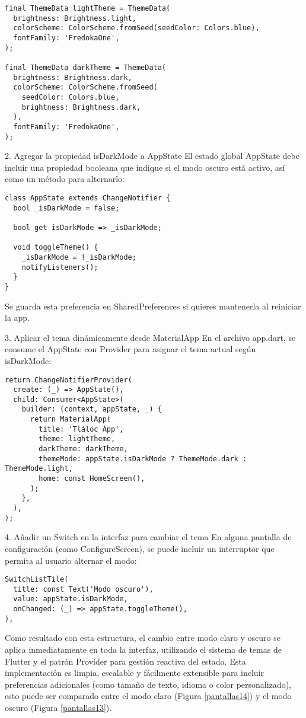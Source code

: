 \begin{verbatim}
final ThemeData lightTheme = ThemeData(
  brightness: Brightness.light,
  colorScheme: ColorScheme.fromSeed(seedColor: Colors.blue),
  fontFamily: 'FredokaOne',
);

final ThemeData darkTheme = ThemeData(
  brightness: Brightness.dark,
  colorScheme: ColorScheme.fromSeed(
    seedColor: Colors.blue,
    brightness: Brightness.dark,
  ),
  fontFamily: 'FredokaOne',
);
\end{verbatim}
2. Agregar la propiedad isDarkMode a AppState
El estado global AppState debe incluir una propiedad booleana que indique si el modo oscuro está activo, así como un método para alternarlo:

\begin{verbatim}
class AppState extends ChangeNotifier {
  bool _isDarkMode = false;

  bool get isDarkMode => _isDarkMode;

  void toggleTheme() {
    _isDarkMode = !_isDarkMode;
    notifyListeners();
  }
}
\end{verbatim}
Se guarda esta preferencia en SharedPreferences si quieres mantenerla al reiniciar la app.


3. Aplicar el tema dinámicamente desde MaterialApp
En el archivo app.dart, se consume el AppState con Provider para asignar el tema actual según isDarkMode:

\begin{verbatim}
return ChangeNotifierProvider(
  create: (_) => AppState(),
  child: Consumer<AppState>(
    builder: (context, appState, _) {
      return MaterialApp(
        title: 'Tláloc App',
        theme: lightTheme,
        darkTheme: darkTheme,
        themeMode: appState.isDarkMode ? ThemeMode.dark : ThemeMode.light,
        home: const HomeScreen(),
      );
    },
  ),
);
\end{verbatim}
4. Añadir un Switch en la interfaz para cambiar el tema
En alguna pantalla de configuración (como ConfigureScreen), se puede incluir un interruptor que permita al usuario alternar el modo:

\begin{verbatim}
SwitchListTile(
  title: const Text('Modo oscuro'),
  value: appState.isDarkMode,
  onChanged: (_) => appState.toggleTheme(),
),
\end{verbatim}
Como resultado con esta estructura, el cambio entre modo claro y oscuro se aplica inmediatamente en toda la interfaz, utilizando el sistema de temas de Flutter y el patrón Provider para gestión reactiva del estado. Esta implementación es limpia, escalable y fácilmente extensible para incluir preferencias adicionales (como tamaño de texto, idioma o color personalizado), esto puede ser comparado entre el modo claro (Figura \ref{pantallas14}) y el modo oscuro (Figura \ref{pantallas13}).


